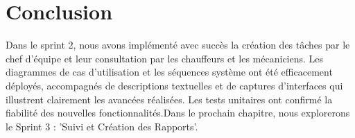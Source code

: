 
\section*{Conclusion}
\bigskip
\begin{sloppypar}
  Dans le sprint 2, nous avons implémenté avec succès la création des tâches par le chef d'équipe et leur consultation par les chauffeurs et les mécaniciens. Les diagrammes de cas d'utilisation et les séquences système ont été efficacement déployés, accompagnés de descriptions textuelles et de captures d'interfaces qui illustrent clairement les avancées réalisées. Les tests unitaires ont confirmé la fiabilité des nouvelles fonctionnalités.Dans le prochain chapitre, nous explorerons le Sprint 3 : 'Suivi et Création des Rapports'.
\end{sloppypar}

